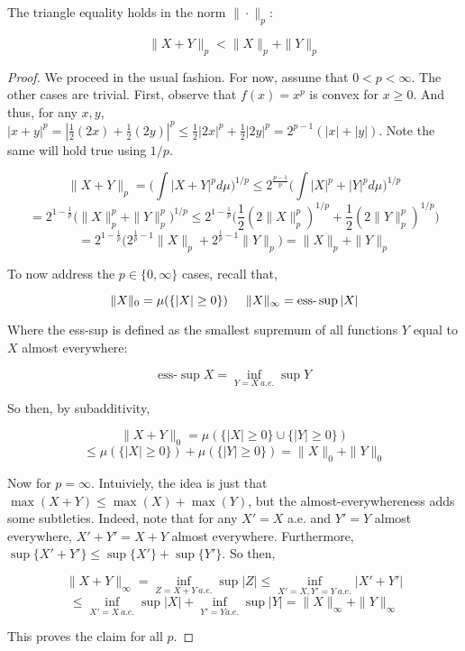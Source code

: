     \begin{theorem}
        The triangle equality holds in the norm $\|\cdot\|_p$: 

        \[ \|X + Y\|_p < \|X\|_p + \|Y\|_p \] 

    \end{theorem}

    \begin{proof}
        We proceed in the usual fashion. For now, assume that 
        $0 < p < \infty$. The other cases are trivial. First, observe that 
        $f(x) = x^p$ is convex for $x \geq 0$. And thus, for any 
        $x,y$, $|x + y|^p = |\frac{1}{2}(2x) + \frac{1}{2}(2y)|^p \leq 
        \frac{1}{2}|2x|^p + \frac{1}{2}|2y|^p = 2^{p-1}(|x| + |y|)$. Note 
        the same will hold true using $1/p$.

        \[ \|X+Y\|_p = \bigg(\int |X + Y|^p d\mu \bigg)^{1/p} \leq 2^{\frac{p-1}{p}} \bigg( \int|X|^p + |Y|^p d\mu \bigg)^{1/p} \]
        \[ = 2^{1 - \frac{1}{p}} \bigg( \|X\|_p^p + \|Y\|_p^p \bigg)^{1/p} \leq 2^{1-\frac{1}{p}} \bigg( \frac{1}{2} (2\|X\|_p^p)^{1/p} + \frac{1}{2} (2\|Y\|_p^p)^{1/p} \bigg) \]
        \[ = 2^{1- \frac{1}{p}} \bigg(2^{\frac{1}{p} - 1}\|X\|_p + 2^{\frac{1}{p} - 1}\|Y\|_p  \bigg) = \|X\|_p + \|Y\|_p \]

        To now address the $p \in \{0,\infty\}$ cases, recall that, 

        \[ \|X\|_0 = \mu(\{|X| \geq 0 \}) \hspace{0.5cm} \|X\|_\infty = \text{ess-}\sup |X| \]

        Where the ess-sup is defined as the smallest supremum of all functions $Y$ equal to $X$ almost everywhere:

        \[ \text{ess-}\sup X = \inf_{Y = X \: a.e.}\sup Y \]
        
        So then, by subadditivity,

        \[ \|X + Y\|_0 = \mu(\{|X| \geq 0\} \cup \{|Y| \geq 0 \}) \] 
        \[ \leq \mu(\{|X| \geq 0\}) + \mu(\{|Y| \geq 0\}) = \|X\|_0 + \|Y\|_0 \]

        Now for $p = \infty$. Intuiviely, the idea is just that 
        $\max(X + Y) \leq \max(X) + \max(Y)$, but the almost-everywhereness 
        adds some subtleties. Indeed, note that for any 
        $X' = X$ a.e. and $Y' = Y$ almost everywhere, $X' + Y' = X + Y$ almost everywhere. 
        Furthermore, $\sup\{X' + Y'\} \leq \sup\{X'\} + \sup\{Y'\}$. So then, 

        \[ \|X+Y\|_\infty = \inf_{Z = X+Y \: a.e.}\sup |Z| \leq \inf_{X' = X, Y' = Y \: a.e.} |X' + Y'|  \]
        \[ \leq \inf_{X' = X \: a.e.}\sup |X| + \inf_{Y' = Y a.e.}\sup |Y| = \|X\|_\infty+ \|Y\|_\infty \]

        This proves the claim for all $p$.
    \end{proof}

